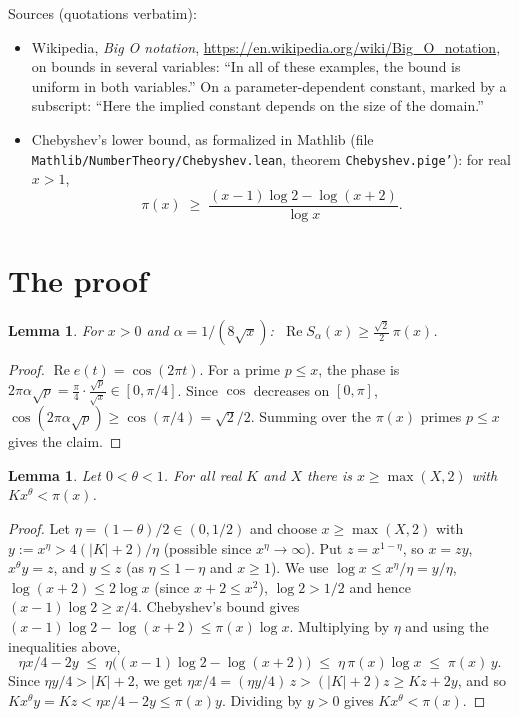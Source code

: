 \documentclass[11pt]{article}
\newtheorem{lemma}[theorem]{Lemma}
\theoremstyle{definition}
\theoremstyle{remark}
\renewcommand{\_}{\oldus\allowbreak}
\begin{document}
Sources (quotations verbatim):
\begin{itemize}
\item Wikipedia, \emph{Big O notation}, \url{https://en.wikipedia.org/wiki/Big_O_notation}, on bounds
  in several variables: ``In all of these examples, the bound is uniform in both variables.'' On a
  parameter-dependent constant, marked by a subscript: ``Here the implied constant depends on the size
  of the domain.''
\item Chebyshev's lower bound, as formalized in Mathlib (file
  \texttt{Mathlib/\allowbreak NumberTheory/\allowbreak Chebyshev.lean},
  theorem \texttt{Chebyshev.pi\_ge'}): for real $x>1$,
  \[ \pi(x) \;\ge\; \frac{(x-1)\log 2 - \log(x+2)}{\log x}. \]
\end{itemize}

\section{The proof}

\begin{lemma}\label{lem:phase}
For $x>0$ and $\alpha = 1/(8\sqrt x)$: $\ \operatorname{Re} S_\alpha(x) \ge \frac{\sqrt2}{2}\,\pi(x)$.
\end{lemma}

\begin{proof}
$\operatorname{Re} e(t) = \cos(2\pi t)$. For a prime $p\le x$, the phase is
$2\pi\alpha\sqrt p = \frac{\pi}{4}\cdot\frac{\sqrt p}{\sqrt x} \in [0,\pi/4]$. Since $\cos$ decreases on
$[0,\pi]$, $\cos(2\pi\alpha\sqrt p) \ge \cos(\pi/4) = \sqrt2/2$. Summing over the $\pi(x)$ primes $p\le x$
gives the claim.
\end{proof}

\begin{lemma}\label{lem:cheb}
Let $0<\theta<1$. For all real $K$ and $X$ there is $x\ge\max(X,2)$ with $K x^\theta < \pi(x)$.
\end{lemma}

\begin{proof}
Let $\eta = (1-\theta)/2 \in (0, 1/2)$ and choose $x \ge \max(X,2)$ with $y := x^\eta > 4(|K|+2)/\eta$
(possible since $x^\eta\to\infty$). Put $z = x^{1-\eta}$, so $x = zy$, $x^\theta y = z$, and $y \le z$
(as $\eta \le 1-\eta$ and $x\ge1$). We use $\log x \le x^\eta/\eta = y/\eta$, $\log(x+2) \le 2\log x$
(since $x+2\le x^2$), $\log 2 > 1/2$ and hence $(x-1)\log 2 \ge x/4$. Chebyshev's bound gives
$(x-1)\log 2 - \log(x+2) \le \pi(x)\log x$. Multiplying by $\eta$ and using the inequalities above,
\[
  \eta x/4 - 2y \;\le\; \eta\bigl((x-1)\log 2 - \log(x+2)\bigr) \;\le\; \eta\,\pi(x)\log x \;\le\; \pi(x)\, y .
\]
Since $\eta y/4 > |K|+2$, we get $\eta x/4 = (\eta y/4)\, z > (|K|+2) z \ge K z + 2y$, and so
$K x^\theta y = K z < \eta x/4 - 2y \le \pi(x) y$. Dividing by $y>0$ gives $K x^\theta < \pi(x)$.
\end{proof}
\end{document}
